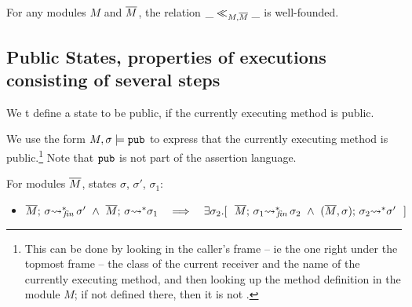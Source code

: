 {{\begin{lemma}
\label{lemma:normal:two}
For any modules $M$ and $\overline{M}$,  the relation $\_ \ll_{M,\overline{M}}  \_$ is well-founded.
\end{lemma}


\subsection{Public States, properties of executions consisting of several steps}

We t define a state to be public, if the currently executing method is public.

\begin{definition}
We use the form
$M, \sigma \models \mbox{\normalfont{\texttt{pub}}}$ to express that the currently executing method is public.\footnote{This can be done by looking in the caller's frame -- ie the one right under the topmost frame -- the class of the current receiver and the name of the currently executing method, and then looking up the method definition in the module $M$; if not defined there, then it is not . }
Note that $\mbox{\normalfont{\texttt{pub}}}$ is not part of the assertion language.
\end{definition}

 \begin{auxLemma}
 \label{lemma:encl:tem}
 For   modules $\overline{M}$,   states $\sigma$, $\sigma'$, $\sigma_1$:
\begin{itemize}
\item
$  \leadstoBoundedStarFin {\Mtwo}  {\sigma}  {\sigma'} \  \wedge \  \leadstoBoundedStar  {\Mtwo}  {\sigma}  {\sigma_1} 
\ \ \  \Longrightarrow\ \ \  %
 \exists \sigma_2.[\ \ \leadstoBoundedStarFin {\Mtwo} {\sigma_1}  {\sigma_2}  
\ \wedge\ 
\leadstoBoundedStarThree  {\Mtwo}  {\sigma_2}  {\sigma}   {\sigma'} \ \ ]$
\end{itemize}

\end{auxLemma} 

}}
